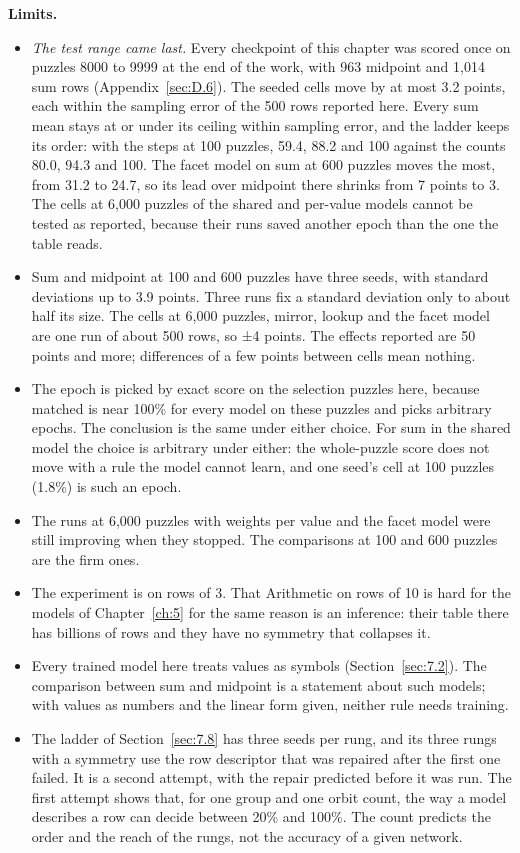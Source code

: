\textbf{Limits.}

\begin{itemize}
\item \emph{The test range came last.} Every checkpoint of this chapter was scored once on puzzles 8000 to 9999 at the end of the work, with 963 midpoint and 1,014 sum rows (Appendix~\ref{sec:D.6}). The seeded cells move by at most 3.2 points, each within the sampling error of the 500 rows reported here. Every sum mean stays at or under its ceiling within sampling error, and the ladder keeps its order: with the steps at 100 puzzles, 59.4, 88.2 and 100 against the counts 80.0, 94.3 and 100. The facet model on sum at 600 puzzles moves the most, from 31.2 to 24.7, so its lead over midpoint there shrinks from 7 points to 3. The cells at 6,000 puzzles of the shared and per-value models cannot be tested as reported, because their runs saved another epoch than the one the table reads.
\item Sum and midpoint at 100 and 600 puzzles have three seeds, with standard deviations up to 3.9 points. Three runs fix a standard deviation only to about half its size. The cells at 6,000 puzzles, mirror, lookup and the facet model are one run of about 500 rows, so ±4 points. The effects reported are 50 points and more; differences of a few points between cells mean nothing.
\item The epoch is picked by exact score on the selection puzzles here, because matched is near 100\% for every model on these puzzles and picks arbitrary epochs. The conclusion is the same under either choice. For sum in the shared model the choice is arbitrary under either: the whole-puzzle score does not move with a rule the model cannot learn, and one seed's cell at 100 puzzles (1.8\%) is such an epoch.
\item The runs at 6,000 puzzles with weights per value and the facet model were still improving when they stopped. The comparisons at 100 and 600 puzzles are the firm ones.
\item The experiment is on rows of 3. That Arithmetic on rows of 10 is hard for the models of Chapter~\ref{ch:5} for the same reason is an inference: their table there has billions of rows and they have no symmetry that collapses it.
\item Every trained model here treats values as symbols (Section~\ref{sec:7.2}). The comparison between sum and midpoint is a statement about such models; with values as numbers and the linear form given, neither rule needs training.
\item The ladder of Section~\ref{sec:7.8} has three seeds per rung, and its three rungs with a symmetry use the row descriptor that was repaired after the first one failed. It is a second attempt, with the repair predicted before it was run. The first attempt shows that, for one group and one orbit count, the way a model describes a row can decide between 20\% and 100\%. The count predicts the order and the reach of the rungs, not the accuracy of a given network.
\end{itemize}
